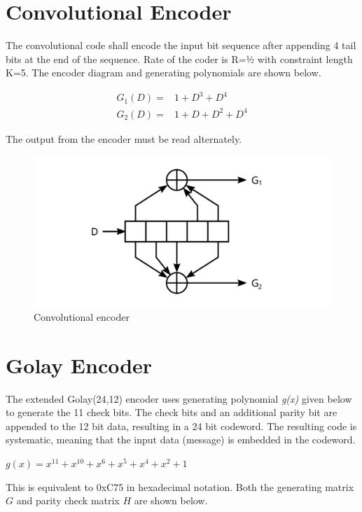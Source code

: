 \documentclass[a4paper,11pt]{book}
\begin{document}
\chapter{Convolutional Encoder}

The convolutional code shall encode the input bit sequence after
appending 4 tail bits at the end of the sequence. Rate of the coder is
R=½ with constraint length K=5. The encoder diagram and generating
polynomials are shown below.

\begin{align*}
	G_1(D) =& 1 + D^3 + D^4 \\
	G_2(D) =& 1+ D + D^2 + D^4
\end{align*}

The output from the encoder must be read alternately.

\begin{figure}[H]
	\centering
	\includegraphics{img/convolutional}
	\caption{Convolutional encoder}
	\label{fig:convolutional}
\end{figure}

\chapter{Golay Encoder}

The extended Golay(24,12) encoder uses generating polynomial \emph{g(x)} given below to generate the 11 check bits. The check bits and an additional parity bit are appended to the 12 bit data, resulting in a 24 bit codeword. The resulting code is systematic, meaning that the input data (message) is embedded in the codeword.

$g(x) = x^{11} + x^{10} + x^6 + x^5 + x^4 + x^2 + 1$

This is equivalent to 0xC75 in hexadecimal notation. Both the generating matrix $G$ and parity check matrix $H$ are shown below.
\end{document}
